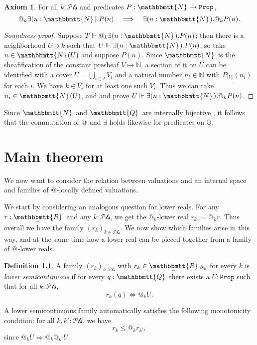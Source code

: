 \documentclass[11pt, oneside, article]{memoir}
\makeatletter
\theoremstyle{plain}
\theoremstyle{definition}
\newtheorem{definition}[theorem]{Definition}
\newtheorem{axiom}{Axiom}
\theoremstyle{remark}
\newenvironment{soundproof}{\begin{proof}[Soundness proof]}{\end{proof}}
\newcommand{\const}[1]{\mathtt{#1}}
\newcommand{\ubar}[1]{\underaccent{\bar}{#1}}
\newcommand{\internal}[1]{\raisebox{-.03ex}{$\mathbbmtt{#1}$}}
\newcommand{\hs}{\hspace{1.1pt}}
\newcommand{\nn}{\mathbb{N}}
\newcommand{\qq}{\mathbb{Q}}
\newcommand{\tnn}{\internal{N}\hs}
\newcommand{\tqq}{\internal{Q}\hs}
\newcommand{\trr}{\internal{R}\hs}
\newcommand{\tlrr}{\ubar{\trr}\hs}
\newcommand{\forces}{\Vdash}
\newcommand{\prop}{\const{Prop}}
\newcommand{\pt}{k}				%
\newcommand{\Pts}{\mathcal{Pts}}		%
\newcommand{\rest}[2]{#1\big|\hspace{0in}_{#2}}
\newcommand{\AtSymbol}{{@}}
\newcommand{\At}[1][\pt]{\AtSymbol_{#1}}
\newcommand{\imp}{\Rightarrow}
\makeatother
\begin{document}
\begin{axiom}
	\label{ax.N_flabby}
	For all $\pt : \Pts$ and predicates $P : \tnn \to \prop$,
	\[
		\At \exists (n : \tnn) . P(n) \quad \Longrightarrow \quad \exists (n : \tnn) . \At P(n).
	\]
\end{axiom}

\begin{soundproof}
Suppose $T\forces\At \exists (n : \tnn) . P(n)$; then there is a neighborhood $U\ni\pt$ such that $U\forces\exists (n : \tnn) . P(n)$, so take $n\in\tnn(U)$ and suppose $P(n)$. Since $\tnn$ is the sheafification of the constant presheaf $V\mapsto\nn$, a section of it on $U$ can be identified with a cover $U=\bigcup_{i\in I}V_i$ and a natural number $n_i\in\nn$ with $\rest{P}{V_i}(n_i)$ for each $i$. We have $k\in V_i$ for at least one such $V_i$. Thus we can take $n_i\in\tnn(U)$, and and prove $U\forces\exists(n:\tnn).\At P(n)$.
\end{soundproof}

Since $\tnn$ and $\tqq$ are internally bijective \cite{**}, it follows that the commutation of $\At[]$ and $\exists$ holds likewise for predicates on $\qq$.

\chapter{Main theorem}

We now want to consider the relation between valuations and an internal space and families of $\At[]$-locally defined valuations.

We start by considering an analogous question for lower reals. For any $r : \tlrr$ and any $\pt : \Pts$, we get the $\At$-lower real $r_\pt := \At r$. Thus overall we have the family $(r_\pt)_{\pt \in \Pts}$. We now show which families arise in this way, and at the same time how a lower real can be pieced together from a family of $\At[]$-lower reals.

\begin{definition}
	A family $(r_\pt)_{\pt : \Pts}$ with $r_\pt \in \tlrr_{\At}$ for every $\pt$ is \emph{lower semicontinuous} if for every $q:\tqq$ there exists a $U:\prop$ such that for all $\pt : \Pts$,
	\begin{equation}\label{eqn.witness}
		r_\pt(q) \Leftrightarrow \At U.
	\end{equation}
\end{definition}

A lower semicontinuous family automatically satisfies the following monotonicity condition: for all $\pt,\pt' : \Pts$, we have
\begin{equation}
	\label{r_pt_monotone}
	r_\pt \le \At r_{\pt'},
\end{equation}
since $\At U \imp \At \At[\pt'] U$.
\end{document}
